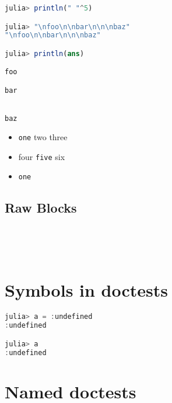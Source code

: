 \begin{lstlisting}[language=julia, style=jlcodestyle]
julia> println(" "^5)

julia> "\nfoo\n\nbar\n\n\nbaz"
"\nfoo\n\nbar\n\n\nbaz"

julia> println(ans)

foo

bar


baz
\end{lstlisting}



\begin{itemize}
\item \texttt{one} two three


\item four \texttt{five} six


\item 
\begin{lstlisting}[]
one
\end{lstlisting}

\end{itemize}


\section{Raw Blocks}



\label{13874303023969489032}{}





\begin{verbatim}




\end{verbatim}



\chapter{Symbols in doctests}



\label{3875383913997789590}{}



\begin{lstlisting}[language=julia, style=jlcodestyle]
julia> a = :undefined
:undefined

julia> a
:undefined
\end{lstlisting}



\chapter{Named doctests}



